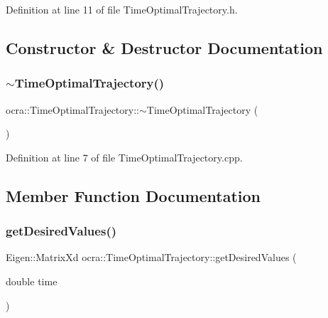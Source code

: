 Definition at line 11 of file Time\+Optimal\+Trajectory.\+h.



\subsection{Constructor \& Destructor Documentation}
\hypertarget{classocra_1_1TimeOptimalTrajectory_a4f4e9ce2cd5b313d8418893d89b5cc8f}{}\label{classocra_1_1TimeOptimalTrajectory_a4f4e9ce2cd5b313d8418893d89b5cc8f} 
\subsubsection{\texorpdfstring{$\sim$\+Time\+Optimal\+Trajectory()}{~TimeOptimalTrajectory()}}
{\footnotesize\ttfamily ocra\+::\+Time\+Optimal\+Trajectory\+::$\sim$\+Time\+Optimal\+Trajectory (\begin{DoxyParamCaption}{ }\end{DoxyParamCaption})\hspace{0.3cm}{\ttfamily [virtual]}}



Definition at line 7 of file Time\+Optimal\+Trajectory.\+cpp.



\subsection{Member Function Documentation}
\hypertarget{classocra_1_1TimeOptimalTrajectory_a42ca0b579494ac0c3c4c842896e592f9}{}\label{classocra_1_1TimeOptimalTrajectory_a42ca0b579494ac0c3c4c842896e592f9} 
\subsubsection{\texorpdfstring{get\+Desired\+Values()}{getDesiredValues()}}
{\footnotesize\ttfamily Eigen\+::\+Matrix\+Xd ocra\+::\+Time\+Optimal\+Trajectory\+::get\+Desired\+Values (\begin{DoxyParamCaption}\item[{double}]{time }\end{DoxyParamCaption})\hspace{0.3cm}{\ttfamily [virtual]}}



